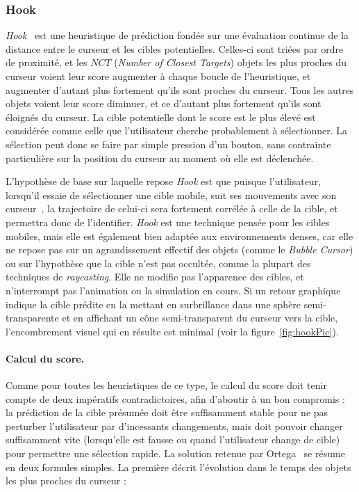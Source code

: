 	\subsubsection{Hook}
	\label{sub:hook}
	\emph{Hook}~\cite{ortega2013hook} est une heuristique de prédiction fondée sur une évaluation continue de la distance entre le curseur et les cibles potentielles. Celles-ci sont triées par ordre de proximité, et les $NCT$ (\emph{Number of Closest Targets}) objets les plus proches du curseur voient leur score augmenter à chaque boucle de l'heuristique, et augmenter d'autant plus fortement qu'ils sont proches du curseur. Tous les autres objets voient leur score diminuer, et ce d'autant plus fortement qu'ils sont éloignés du curseur. La cible potentielle dont le score est le plus élevé est considérée comme celle que l'utilisateur cherche probablement à sélectionner. La sélection peut donc se faire par simple pression d'un bouton, sans contrainte particulière sur la position du curseur au moment où elle est déclenchée.

	L'hypothèse de base sur laquelle repose \emph{Hook} est que puisque l'utilisateur, lorsqu'il essaie de sélectionner une cible mobile, \og suit \fg{} ses mouvements avec son curseur~\cite{hasan2011comet}, la trajectoire de celui-ci sera fortement corrélée à celle de la cible, et permettra donc de l'identifier. \emph{Hook} est une technique pensée pour les cibles mobiles, mais elle est également bien adaptée aux environnements denses, car elle ne repose pas sur un agrandissement effectif des objets (comme le \emph{Bubble Cursor}) ou sur l'hypothèse que la cible n'est pas occultée, comme la plupart des techniques de \emph{raycasting}. Elle ne modifie pas l'apparence des cibles, et n'interrompt pas l'animation ou la simulation en cours. Si un retour graphique indique la cible prédite en la mettant en surbrillance dans une sphère semi-transparente et en affichant un cône semi-transparent du curseur vers la cible, l'encombrement visuel qui en résulte est minimal (voir la figure~\ref{fig:hookPic}).
	
	\paragraph{Calcul du score.}
	Comme pour toutes les heuristiques de ce type, le calcul du score doit tenir compte de deux impératifs contradictoires, afin d'aboutir à un bon compromis : la prédiction de la cible présumée doit être suffisamment stable pour ne pas perturber l'utilisateur par d'incessants changements, mais doit pouvoir changer suffisamment vite (lorsqu'elle est fausse ou quand l'utilisateur change de cible) pour permettre une sélection rapide. La solution retenue par Ortega~\cite{ortega2013hook} se résume en deux formules simples. La première décrit l'évolution dans le temps des objets les plus proches du curseur :
	
